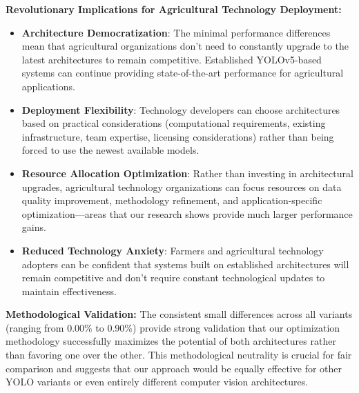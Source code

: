 \textbf{Revolutionary Implications for Agricultural Technology Deployment:}

\begin{itemize}
    \item \textbf{Architecture Democratization}: The minimal performance differences mean that agricultural organizations don't need to constantly upgrade to the latest architectures to remain competitive. Established YOLOv5-based systems can continue providing state-of-the-art performance for agricultural applications.
    
    \item \textbf{Deployment Flexibility}: Technology developers can choose architectures based on practical considerations (computational requirements, existing infrastructure, team expertise, licensing considerations) rather than being forced to use the newest available models.
    
    \item \textbf{Resource Allocation Optimization}: Rather than investing in architectural upgrades, agricultural technology organizations can focus resources on data quality improvement, methodology refinement, and application-specific optimization—areas that our research shows provide much larger performance gains.
    
    \item \textbf{Reduced Technology Anxiety}: Farmers and agricultural technology adopters can be confident that systems built on established architectures will remain competitive and don't require constant technological updates to maintain effectiveness.
\end{itemize}

\textbf{Methodological Validation:} The consistent small differences across all variants (ranging from 0.00\% to 0.90\%) provide strong validation that our optimization methodology successfully maximizes the potential of both architectures rather than favoring one over the other. This methodological neutrality is crucial for fair comparison and suggests that our approach would be equally effective for other YOLO variants or even entirely different computer vision architectures.

